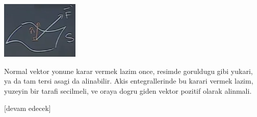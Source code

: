 \documentclass[12pt,fleqn]{article}\usepackage{../../common}
\begin{document}
\includegraphics[width=10em]{calc_multi_27_03.png}

Normal vektor yonune karar vermek lazim once, resimde goruldugu gibi yukari,
ya da tam tersi asagi da alinabilir. Akis entegrallerinde bu karari vermek
lazim, yuzeyin bir tarafi secilmeli, ve oraya dogru giden vektor pozitif
olarak alinmali. 











[devam edecek]
\end{document}
